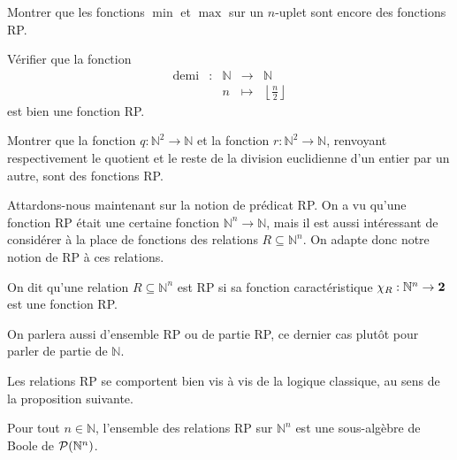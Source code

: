 \begin{exercise}
  Montrer que les fonctions $\min$ et $\max$ sur un $n$-uplet sont encore des
  fonctions RP.
\end{exercise}

\begin{exercise}
  Vérifier que la fonction
  \[\begin{array}{ccccc}
  \mathrm{demi} & : & \mathbb N &\longrightarrow & \mathbb N\\
  & & n &\longmapsto & \displaystyle\left\lfloor \frac{n}{2}\right\rfloor
  \end{array}\]
  est bien une fonction RP.
\end{exercise}

\begin{exercise}
  Montrer que la fonction $q : \mathbb N^2 \to \mathbb N$ et la fonction
  $r : \mathbb N^2 \to \mathbb N$, renvoyant respectivement le quotient et le
  reste de la division euclidienne d'un entier par un autre, sont des fonctions
  RP.
\end{exercise}

Attardons-nous maintenant sur la notion de prédicat RP. On a vu qu'une fonction
RP était une certaine fonction $\mathbb N^n \to \mathbb N$, mais il est aussi
intéressant de considérer à la place de fonctions des relations
$R\subseteq \mathbb N^n$. On adapte donc notre notion de RP à ces relations.

\begin{definition}[Relation RP]
  On dit qu'une relation $R \subseteq \mathbb N^n$ est RP si sa fonction
  caractéristique $\chi_R : \mathbb N^n \to \boldsymbol{2}$ est une fonction RP.
\end{definition}

\begin{remark}
  On parlera aussi d'ensemble RP ou de partie RP, ce dernier cas plutôt pour
  parler de partie de $\mathbb N$.
\end{remark}

Les relations RP se comportent bien vis à vis de la logique classique, au sens
de la proposition suivante.

\begin{proposition}\label{prop.PRBool}
  Pour tout $n \in \mathbb N$, l'ensemble des relations RP sur $\mathbb N^n$
  est une sous-algèbre de Boole de $\mathcal{P}(\mathbb N^n)$.
\end{proposition}

